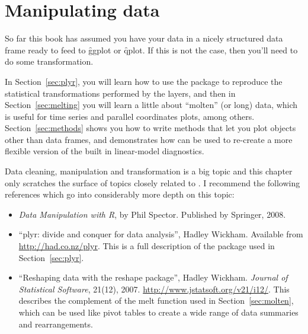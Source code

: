 

% 


\chapter{Manipulating data}
\label{cha:data}

So far this book has assumed you have your data in a nicely structured data frame ready to feed to \f{ggplot} or \f{qplot}. If this is not the case, then you'll need to do some transformation.  

In Section~\ref{sec:plyr}, you will learn how to use the  package to reproduce the statistical transformations performed by the layers, and then in Section~\ref{sec:melting} you will learn a little about ``molten'' (or long) data, which is useful for time series and parallel coordinates plots, among others.  Section~\ref{sec:methods} shows you how to write methods that let you plot objects other than data frames, and demonstrates how \ggplot can be used to re-create a more flexible version of the built in linear-model diagnostics.  

Data cleaning, manipulation and transformation is a big topic and this chapter only scratches the surface of topics closely related to \ggplot.  I recommend the following references which go into considerably more depth on this topic:

\begin{itemize}
  \item \emph{Data Manipulation with R}, by Phil Spector.  Published by Springer, 2008.
  
  \item ``plyr: divide and conquer for data analysis'', Hadley Wickham.  Available from \url{http://had.co.nz/plyr}.  This is a full description of the package used in Section~\ref{sec:plyr}.

  \item ``Reshaping data with the reshape package'', Hadley Wickham. \emph{Journal of Statistical Software}, 21(12), 2007. \url{http://www.jstatsoft.org/v21/i12/}.  This describes the complement of the melt function used in Section~\ref{sec:molten}, which can be used like pivot tables to create a wide range of data summaries and rearrangements.
  
\end{itemize}

